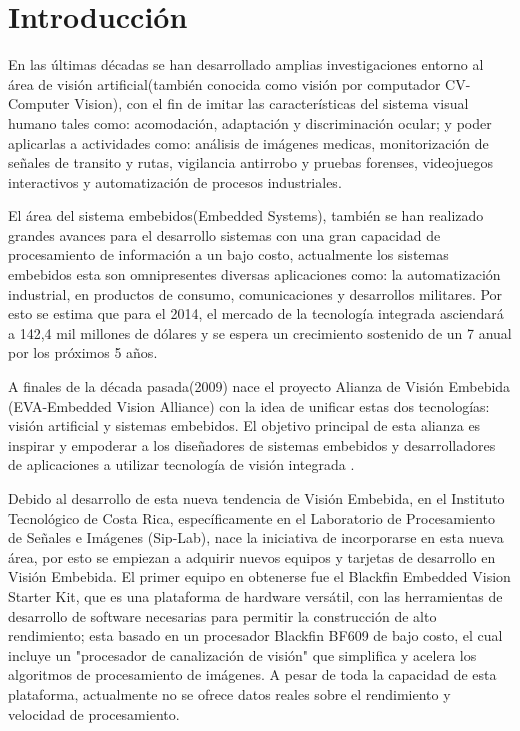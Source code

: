 
\chapter{Introducción}
\label{chp:intro}
En las últimas décadas se han desarrollado amplias investigaciones entorno al área de visión artificial(también conocida como visión por computador CV-Computer Vision)\cite{Shilov1973}, con el fin de imitar las características del sistema visual humano tales como: acomodación, adaptación y discriminación ocular; y poder aplicarlas a actividades como: análisis de imágenes medicas, monitorización de señales de transito y rutas, vigilancia antirrobo y pruebas forenses, videojuegos interactivos y automatización de procesos industriales. 

El área del sistema embebidos(Embedded Systems), también se han realizado grandes avances para el desarrollo sistemas con una gran capacidad de procesamiento de información a un bajo costo, actualmente los sistemas embebidos esta son omnipresentes diversas aplicaciones como: la automatización industrial, en productos de consumo, comunicaciones y desarrollos militares. Por esto se estima que para el 2014, el mercado de la tecnología integrada asciendará a 142,4 mil millones de dólares y se espera un crecimiento sostenido de un 7 anual por los próximos 5 años\cite{market2014}.



A finales de la década pasada(2009) nace el proyecto Alianza de Visión Embebida (EVA-Embedded Vision Alliance) con la idea de unificar estas dos tecnologías: visión artificial y sistemas embebidos. El objetivo principal de esta alianza es inspirar y empoderar a los diseñadores de sistemas embebidos y desarrolladores de aplicaciones a utilizar tecnología de visión integrada \cite{alliance2014}. 

Debido al desarrollo de esta nueva tendencia de Visión Embebida, en el Instituto Tecnológico de Costa Rica, específicamente en el Laboratorio de Procesamiento de Señales e Imágenes (Sip-Lab), nace la iniciativa de incorporarse en esta nueva área, por esto se empiezan a adquirir nuevos equipos y tarjetas de desarrollo en Visión Embebida. El primer equipo en obtenerse fue el Blackfin Embedded Vision Starter Kit, que es una plataforma de hardware versátil, con las herramientas de desarrollo de software necesarias para permitir la construcción de alto rendimiento; esta basado en un procesador Blackfin BF609 de bajo costo, el cual incluye un "procesador de canalización de visión" que simplifica y acelera los algoritmos de procesamiento de imágenes\cite{finboard}. A pesar de toda la capacidad de esta plataforma, actualmente no se ofrece datos reales sobre el rendimiento y velocidad de procesamiento.

